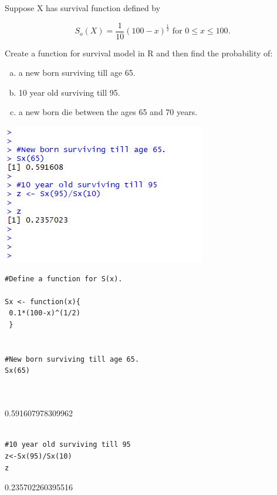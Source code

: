 \documentclass[a4paper,12pt]{article}
\begin{document}
\large 

\noindent Suppose X has survival function defined by


\[ S_{o}(X) = \frac{1}{10} (100 - x)^{\frac{1}{2}} \mbox { for }0 \leq x \leq 100.\]

\noindent Create a function for survival model in R and then find the probability of:

\begin{enumerate}[(a)]
    \item a new born surviving till age 65.
    \item 10 year old surviving till 95.
    \item a new born die between the ages 65 and 70 years.
\end{enumerate}


\includegraphics[]{00-B2/images/Mortality_1.JPG}

\begin{framed} \begin{verbatim}
#Define a function for S(x).

Sx <- function(x){
 0.1*(100-x)^(1/2)
 }


#New born surviving till age 65.
Sx(65)



\end{verbatim}\end{framed}


0.591607978309962



\begin{framed} \begin{verbatim}

#10 year old surviving till 95
z<-Sx(95)/Sx(10)
z

\end{verbatim}\end{framed}


0.235702260395516
\end{document}
